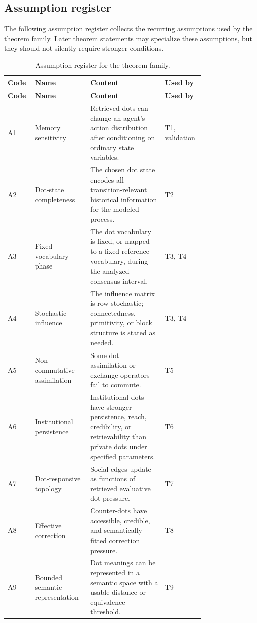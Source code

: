 \documentclass[11pt]{article}
\theoremstyle{remark}
\begin{document}
\subsection{Assumption register}\label{assumption-register}

The following assumption register collects the recurring assumptions used by the theorem family. Later theorem statements may specialize these assumptions, but they should not silently require stronger conditions.

{\small
\begin{longtable}{L{0.10\linewidth}L{0.22\linewidth}L{0.34\linewidth}L{0.12\linewidth}}
\caption{Assumption register for the theorem family.}\label{tab:assumption-register}\\
\toprule
\textbf{Code} & \textbf{Name} & \textbf{Content} & \textbf{Used by}\\
\midrule
\endfirsthead
\toprule
\textbf{Code} & \textbf{Name} & \textbf{Content} & \textbf{Used by}\\
\midrule
\endhead
A1 & Memory sensitivity & Retrieved dots can change an agent's action distribution after conditioning on ordinary state variables. & T1, validation\\
A2 & Dot-state completeness & The chosen dot state encodes all transition-relevant historical information for the modeled process. & T2\\
A3 & Fixed vocabulary phase & The dot vocabulary is fixed, or mapped to a fixed reference vocabulary, during the analyzed consensus interval. & T3, T4\\
A4 & Stochastic influence & The influence matrix is row-stochastic; connectedness, primitivity, or block structure is stated as needed. & T3, T4\\
A5 & Non-commutative assimilation & Some dot assimilation or exchange operators fail to commute. & T5\\
A6 & Institutional persistence & Institutional dots have stronger persistence, reach, credibility, or retrievability than private dots under specified parameters. & T6\\
A7 & Dot-responsive topology & Social edges update as functions of retrieved evaluative dot pressure. & T7\\
A8 & Effective correction & Counter-dots have accessible, credible, and semantically fitted correction pressure. & T8\\
A9 & Bounded semantic representation & Dot meanings can be represented in a semantic space with a usable distance or equivalence threshold. & T9\\

\end{longtable}}
\end{document}
